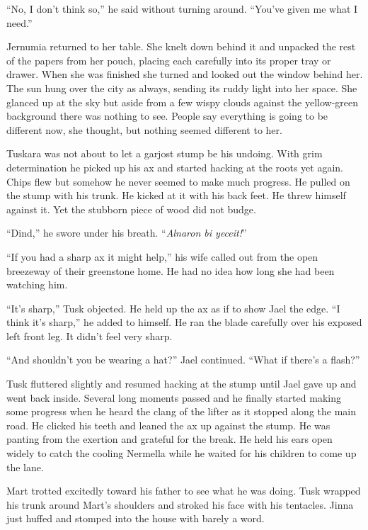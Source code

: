 ``No, I don't think so,'' he said without turning around. ``You've given me what I need.''

Jernumia returned to her table. She knelt down behind it and unpacked the rest of the papers
from her pouch, placing each carefully into its proper tray or drawer. When she was finished she
turned and looked out the window behind her. The sun hung over the city as always, sending its
ruddy light into her space. She glanced up at the sky but aside from a few wispy clouds against
the yellow-green background there was nothing to see. People say everything is going to be
different now, she thought, but nothing seemed different to her.

\spacebreak

Tuskara was not about to let a garjost stump be his undoing. With grim determination he picked
up his ax and started hacking at the roots yet again. Chips flew but somehow he never seemed to
make much progress. He pulled on the stump with his trunk. He kicked at it with his back feet.
He threw himself against it. Yet the stubborn piece of wood did not budge.

``Dind,'' he swore under his breath. ``\textit{Alnaron bi yeceit!}''

``If you had a sharp ax it might help,'' his wife called out from the open breezeway of their
greenstone home. He had no idea how long she had been watching him.

``It's sharp,'' Tusk objected. He held up the ax as if to show Jael the edge. ``I think it's
sharp,'' he added to himself. He ran the blade carefully over his exposed left front leg. It
didn't feel very sharp.

``And shouldn't you be wearing a hat?'' Jael continued. ``What if there's a flash?''

Tusk fluttered slightly and resumed hacking at the stump until Jael gave up and went back
inside. Several long moments passed and he finally started making some progress when he heard
the clang of the lifter as it stopped along the main road. He clicked his teeth and leaned the
ax up against the stump. He was panting from the exertion and grateful for the break. He held
his ears open widely to catch the cooling Nermella while he waited for his children to come up
the lane.

Mart trotted excitedly toward his father to see what he was doing. Tusk wrapped his trunk around
Mart's shoulders and stroked his face with his tentacles. Jinna just huffed and stomped into the
house with barely a word.

